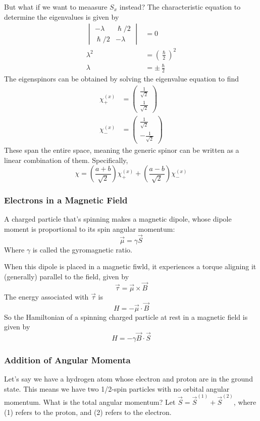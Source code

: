\documentclass[a4paper]{article}
\begin{document}
But what if we want to meaasure $S_x$ instead? The characteristic equation to
determine the eigenvalues is given by
\begin{align*}
	\begin{vmatrix}-\lambda&\hslash/2\\\hslash/2&-\lambda\end{vmatrix}&=0\\
	\lambda^2&=\left(\frac{\hslash}{2}\right)^2\\
	\lambda&=\pm\frac{\hslash}{2}
\end{align*}
The eigenspinors can be obtained by solving the eigenvalue equation to find
\begin{align*}
	\chi_+^{(x)}
	&=\begin{pmatrix}\frac{1}{\sqrt{2}}\\\frac{1}{\sqrt{2}}\end{pmatrix}\\
	\chi_-^{(x)}
	&=\begin{pmatrix}\frac{1}{\sqrt{2}}\\-\frac{1}{\sqrt{2}}\end{pmatrix}
\end{align*}
These span the entire space, meaning the generic spinor can be written as a
linear combination of them. Specifically,
\[ \chi = \left(\frac{a+b}{\sqrt{2}}\right)\chi_+^{(x)} +
\left(\frac{a-b}{\sqrt{2}}\right)\chi_-^{(x)} \]

\subsubsection{Electrons in a Magnetic Field}
A charged particle that's spinning makes a magnetic dipole, whose dipole
moment is proportional to its spin angular momentum:
\[ \vec{\mu} = \gamma\vec{S} \]
Where $\gamma$ is called the gyromagnetic ratio.

When this dipole is placed in a magnetic fiwld, it experiences a torque
aligning it (generally) parallel to the field, given by
\[ \vec{\tau} = \vec{\mu}\times\vec{B} \]
The energy associated with $\vec{\tau}$ is
\[ H = -\vec{\mu}\cdot\vec{B} \]
So the Hamiltonian of a spinning charged particle at rest in a magnetic field
is given by
\[ H = -\gamma\vec{B}\cdot\vec{S} \]

\subsubsection{Addition of Angular Momenta}

Let's say we have a hydrogen atom whose electron and proton are in the ground
state. This means we have two 1/2-spin particles with no orbital angular
momentum. What is the total angular momentum? Let
$\vec{S}=\vec{S}^{(1)}+\vec{S}^{(2)}$, where (1) refers to the proton, and
(2) refers to the electron.
\end{document}
